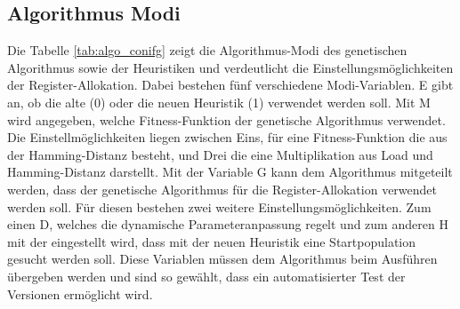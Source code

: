 \newpage
\subsection{Algorithmus Modi}
Die Tabelle \ref{tab:algo_conifg} zeigt die Algorithmus-Modi des genetischen Algorithmus sowie der Heuristiken und verdeutlicht die Einstellungsmöglichkeiten der Register-Allokation. Dabei bestehen fünf verschiedene Modi-Variablen. E gibt an, ob die alte (0) oder die neuen Heuristik (1) verwendet werden soll. Mit M wird angegeben, welche Fitness-Funktion der genetische Algorithmus verwendet. Die Einstellmöglichkeiten liegen zwischen Eins, für eine Fitness-Funktion die aus der Hamming-Distanz besteht, und Drei die eine Multiplikation aus Load und Hamming-Distanz darstellt. Mit der Variable G  kann dem Algorithmus mitgeteilt werden, dass der genetische Algorithmus für die Register-Allokation verwendet werden soll. Für diesen bestehen zwei weitere Einstellungsmöglichkeiten. Zum einen D, welches die dynamische Parameteranpassung regelt und zum anderen H mit der eingestellt wird, dass mit der neuen Heuristik eine Startpopulation gesucht werden soll. Diese Variablen müssen dem Algorithmus beim Ausführen übergeben werden und sind so gewählt, dass ein automatisierter Test der Versionen ermöglicht wird.

